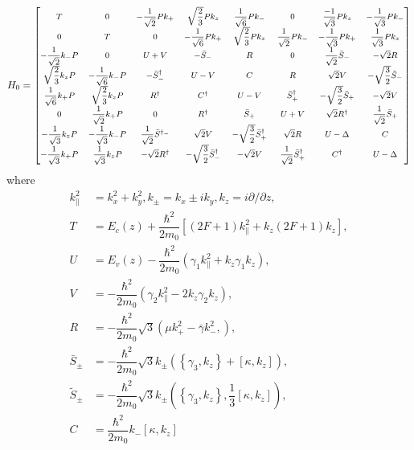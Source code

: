 \begin{equation}\label{eqn:chapter2:section-numerical-calculations-8x8-hamiltonian}
  H_{0}={\footnotesize\begin{bmatrix}
T & 0  &-\dfrac{1}{\sqrt{2}}Pk_{+}& \sqrt{\dfrac{2}{3}} Pk_{z}   & \dfrac{1}{\sqrt{6}}Pk_{-} & 0 & \dfrac{-1}{\sqrt{3}}Pk_{z} & -\dfrac{1}{\sqrt{3}}Pk_{-}\\

0 & T & 0& -\dfrac{1}{\sqrt{6}}Pk_{+}& \sqrt{\dfrac{2}{3}} Pk_{z}& \dfrac{1}{\sqrt{2}}Pk_{-}  &-\dfrac{1}{\sqrt{3}}Pk_{+}& \dfrac{1}{\sqrt{3}}Pk_{z}\\

-\dfrac{1}{\sqrt{2}}k_{-}P & 0 & U+V & -\bar{S}_{-} & R & 0 & \dfrac{1}{\sqrt{2}}\bar{S}_{-} & -\sqrt{2}R\\

\sqrt{\dfrac{2}{3}} k_{z}P&-\dfrac{1}{\sqrt{6}}k_{-}P& -\bar{S}^{\dagger}_{-}&U-V&C&R&\sqrt{2}V&-\sqrt{\dfrac{3}{2}}\tilde{S}_{-}\\
\dfrac{1}{\sqrt{6}}k_{+}P & \sqrt{\dfrac{2}{3}}k_{z}P&R^{\dagger}&C^{\dagger}&U-V&\bar{S}^{\dagger}_{+}&-\sqrt{\dfrac{3}{2}}\bar{S}_{+}&-\sqrt{2}V\\
0&\dfrac{1}{\sqrt{2}}k_{+}P&0&R^{\dagger}&\bar{S}_{+}&U+V&\sqrt{2}R^{\dagger}&\dfrac{1}{\sqrt{2}}\bar{S}_{+}\\
-\dfrac{1}{\sqrt{3}}k_{z}P&-\dfrac{1}{\sqrt{3}}k_{-}P&\dfrac{1}{\sqrt{2}}\bar{S}^{\dagger_{-}}&\sqrt{2}V&-\sqrt{\dfrac{3}{2}}\bar{S}^{\dagger}_{+}&\sqrt{2}R&U-\Delta&C\\
-\dfrac{1}{\sqrt{3}}k_{+}P&\dfrac{1}{\sqrt{3}}k_{z}P&-\sqrt{2}R^{\dagger}&-\sqrt{\dfrac{3}{2}}\bar{S}^{\dagger}_{-}&-\sqrt{2}V&\dfrac{1}{\sqrt{2}}\bar{S}^{\dagger}_{+}&C^{\dagger}&U-\Delta\\
\end{bmatrix}}
\end{equation}
where 
\begin{align*}
	k^{2}_{\parallel}&=k_{x}^{2}+k^{2}_{y},  k_{\pm}=k_{x}\pm ik_{y},  k_{z}=i\partial/\partial z,\\
	T&=E_{c}(z)+\dfrac{\hbar^{2}}{2m_{0}}\left[(2F+1)k^{2}_{\parallel}+k_{z}(2F+1)k_{z}\right], \\
	U&=E_{v}(z)-\dfrac{\hbar^{2}}{2m_{0}}\left(\gamma_{1}k^{2}_{\parallel}+k_{z}\gamma_{1}k_{z} \right),\\ 
	V&=-\dfrac{\hbar^{2}}{2m_{0}}\left(\gamma_{2}k^{2}_{\parallel}-2k_{z}\gamma_{2}k_{z}\right),\\ 
	R&=-\dfrac{\hbar^{2}}{2m_{0}}\sqrt{3}\left(\mu k^{2}_{+}-\bar{\gamma}k^{2}_{-},\right),\\
	\bar{S}_{\pm}&=-\dfrac{\hbar^{2}}{2m_{0}}\sqrt{3}k_{\pm}\left(\left\lbrace\gamma_{3},k_{z}\right\rbrace+\left[\kappa,k_{z}\right]\right),\\
	\tilde{S}_{\pm}&=-\dfrac{\hbar^{2}}{2m_{0}}\sqrt{3}k_{\pm}\left(\left\lbrace\gamma_{3},k_{z}\right\rbrace,\dfrac{1}{3}\left[\kappa,k_{z}\right]\right),\\
	C&=\dfrac{\hbar^{2}}{2m_{0}}k_{-}\left[\kappa,k_{z}\right]
\end{align*}

